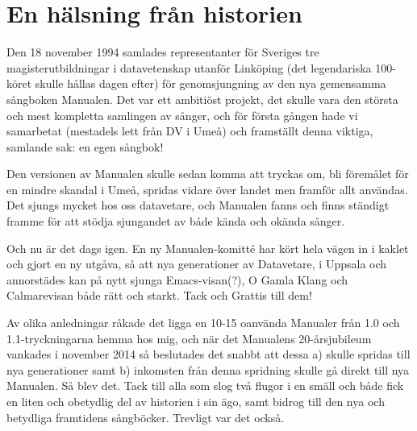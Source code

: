 \documentclass[a6paper,fontsize=10pt,twoside,open=right]{scrbook}
\begin{document}
\section{En hälsning från historien}\vspace{10pt}
\setlength{\parindent}{15pt}
\noindent\hspace{15pt}Den 18 november 1994 samlades representanter för
Sveriges tre magisterutbildningar i datavetenskap utanför Linköping
(det legendariska 100-köret skulle hållas dagen efter) för
genomsjungning av den nya gemensamma sångboken Manualen. Det var ett
ambitiöst projekt, det skulle vara den största och mest kompletta
samlingen av sånger, och för första gången hade vi samarbetat
(mestadels lett från DV i Umeå) och framställt denna viktiga, samlande
sak: en egen sångbok!

Den versionen av Manualen skulle sedan komma
att tryckas om, bli föremålet för en mindre skandal i Umeå, spridas
vidare över landet men framför allt användas. Det sjungs mycket hos
oss datavetare, och Manualen fanns och finns ständigt framme för att
stödja sjungandet av både kända och okända sånger.

Och nu är det dags igen. En ny Manualen-komitté
har kört hela vägen in i kaklet och gjort en ny utgåva, så att nya
generationer av Datavetare, i Uppsala och annorstädes kan på nytt
sjunga Emacs-visan(?), O Gamla Klang och Calmarevisan både rätt och
starkt. Tack och Grattis till dem!

Av olika anledningar råkade det ligga en 10-15
oanvända Manualer från 1.0 och 1.1-tryckningarna hemma hos mig, och
när det Manualens 20-årsjubileum vankades i november 2014 så
beslutades det snabbt att dessa a) skulle spridas till nya
generationer samt b) inkomsten från denna spridning skulle gå direkt
till nya Manualen. Så blev det. Tack till alla som slog två flugor i
en smäll och både fick en liten och obetydlig del av historien i sin
ägo, samt bidrog till den nya och betydliga framtidens
sångböcker. Trevligt var det också.
\end{document}
